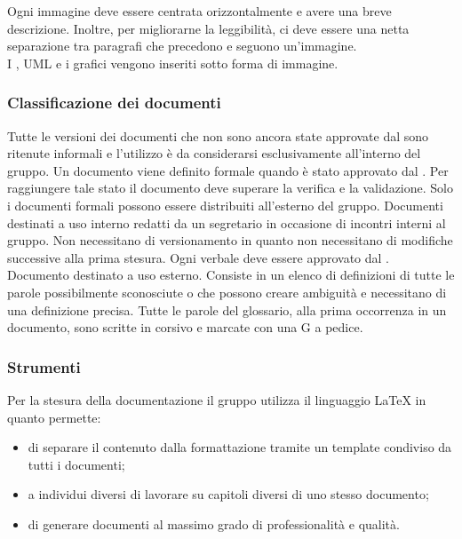             Ogni immagine deve essere centrata orizzontalmente e avere una breve descrizione. Inoltre, per migliorarne la leggibilità, ci deve essere una netta separazione tra paragrafi che precedono e seguono un'immagine.\\
            I , UML e i grafici vengono inseriti sotto forma di immagine. 
            

        \subsubsection{Classificazione dei documenti}
            Tutte le versioni dei documenti che non sono ancora state approvate dal \roleProjectManagerP{} sono ritenute informali e l'utilizzo è da considerarsi esclusivamente all'interno del gruppo.
            Un documento viene definito formale quando è stato approvato dal \roleProjectManagerP{}. Per raggiungere tale stato il documento deve superare la verifica e la validazione. Solo i documenti formali possono essere distribuiti all'esterno del gruppo.
            Documenti destinati a uso interno redatti da un segretario in occasione di incontri interni al gruppo. Non necessitano di versionamento in quanto non necessitano di modifiche successive alla prima stesura. Ogni verbale deve essere approvato dal \roleProjectManagerP{}.
            Documento destinato a uso esterno. Consiste in un elenco di definizioni di tutte le parole possibilmente sconosciute o che possono creare ambiguità e necessitano di una definizione precisa. Tutte le parole del glossario, alla prima occorrenza in un documento, sono scritte in corsivo e marcate con una G a pedice.

        \subsubsection{Strumenti}
            \myparagraph{\LaTeX{}}
            Per la stesura della documentazione il gruppo utilizza il linguaggio \LaTeX{} in quanto permette:
                \begin{itemize}
                    \item di separare il contenuto dalla formattazione tramite un template condiviso da tutti i documenti;
                    \item a individui diversi di lavorare su capitoli diversi di uno stesso documento;
                    \item di generare documenti al massimo grado di professionalità e qualità.
                \end{itemize}

